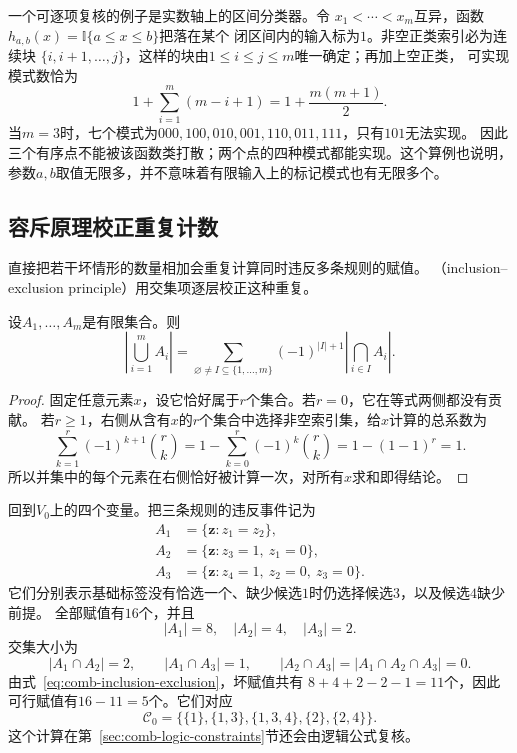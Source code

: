 一个可逐项复核的例子是实数轴上的区间分类器。令
$x_1<\cdots<x_m$互异，函数$h_{a,b}(x)=\mathbb{I}\{a\leq x\leq b\}$把落在某个
闭区间内的输入标为$1$。非空正类索引必为连续块
$\{i,i+1,\ldots,j\}$，这样的块由$1\leq i\leq j\leq m$唯一确定；再加上空正类，
可实现模式数恰为
\[
  1+\sum_{i=1}^{m}(m-i+1)
  =
  1+\frac{m(m+1)}2.
\]
当$m=3$时，七个模式为$000,100,010,001,110,011,111$，只有$101$无法实现。
因此三个有序点不能被该函数类打散；两个点的四种模式都能实现。这个算例也说明，
参数$a,b$取值无限多，并不意味着有限输入上的标记模式也有无限多个。

\subsection{容斥原理校正重复计数}

直接把若干坏情形的数量相加会重复计算同时违反多条规则的赋值。
（inclusion--exclusion principle）用交集项逐层校正这种重复。

\begin{theorem}[有限容斥原理]
\label{thm:comb-inclusion-exclusion}
设$A_1,\ldots,A_m$是有限集合。则
\begin{equation}
  \left|\bigcup_{i=1}^{m}A_i\right|
  =
  \sum_{\varnothing\neq I\subseteq\{1,\ldots,m\}}
  (-1)^{|I|+1}
  \left|\bigcap_{i\in I}A_i\right|.
  \label{eq:comb-inclusion-exclusion}
\end{equation}
\end{theorem}

\begin{proof}
固定任意元素$x$，设它恰好属于$r$个集合。若$r=0$，它在等式两侧都没有贡献。
若$r\geq1$，右侧从含有$x$的$r$个集合中选择非空索引集，给$x$计算的总系数为
\[
  \sum_{k=1}^{r}(-1)^{k+1}\binom{r}{k}
  =
  1-\sum_{k=0}^{r}(-1)^k\binom{r}{k}
  =1-(1-1)^r=1.
\]
所以并集中的每个元素在右侧恰好被计算一次，对所有$x$求和即得结论。
\end{proof}

回到$V_0$上的四个变量。把三条规则的违反事件记为
\[
  \begin{aligned}
    A_1&=\{\bm{z}:z_1=z_2\},\\
    A_2&=\{\bm{z}:z_3=1,\ z_1=0\},\\
    A_3&=\{\bm{z}:z_4=1,\ z_2=0,\ z_3=0\}.
  \end{aligned}
\]
它们分别表示基础标签没有恰选一个、缺少候选$1$时仍选择候选$3$，以及候选$4$缺少前提。
全部赋值有$16$个，并且
\[
  |A_1|=8,\quad |A_2|=4,\quad |A_3|=2.
\]
交集大小为
\[
  |A_1\cap A_2|=2,\qquad
  |A_1\cap A_3|=1,\qquad
  |A_2\cap A_3|=|A_1\cap A_2\cap A_3|=0.
\]
由式~\eqref{eq:comb-inclusion-exclusion}，坏赋值共有
$8+4+2-2-1=11$个，因此可行赋值有$16-11=5$个。它们对应
\begin{equation}
  \mathcal{C}_0
  =
  \bigl\{
  \{1\},\{1,3\},\{1,3,4\},\{2\},\{2,4\}
  \bigr\}.
  \label{eq:comb-running-feasible-family}
\end{equation}
这个计算在第~\ref{sec:comb-logic-constraints}节还会由逻辑公式复核。

